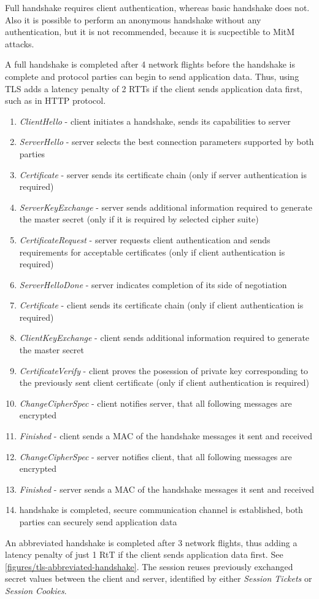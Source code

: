 Full handshake requires client authentication, whereas basic handshake does not. Also it is possible to perform an anonymous handshake without any authentication, but it is not recommended, because it is sucpectible to MitM attacks.

A full handshake is completed after 4 network flights before the handshake is complete and protocol parties can begin to send application data. Thus, using TLS adds a latency penalty of 2 RTTs if the client sends application data first, such as in HTTP protocol.

\begin{enumerate}
  \item \textit{ClientHello} - client initiates a handshake, sends its capabilities to server
  \item \textit{ServerHello} - server selects the best connection parameters supported by both parties
  \item \textit{Certificate} - server sends its certificate chain (only if server authentication is required)
  \item \textit{ServerKeyExchange} - server sends additional information required to generate the master secret (only if it is required by selected cipher suite)
  \item \textit{CertificateRequest} - server requests client authentication and sends requirements for acceptable certificates (only if client authentication is required)
  \item \textit{ServerHelloDone} - server indicates completion of its side of negotiation
  \item \textit{Certificate} - client sends its certificate chain (only if client authentication is required)
  \item \textit{ClientKeyExchange} - client sends additional information required to generate the master secret
  \item \textit{CertificateVerify} - client proves the posession of private key corresponding to the previously sent client certificate (only if client authentication is required)
  \item \textit{ChangeCipherSpec} - client notifies server, that all following messages are encrypted
  \item \textit{Finished} - client sends a MAC of the handshake messages it sent and received
  \item \textit{ChangeCipherSpec} - server notifies client, that all following messages are encrypted
  \item \textit{Finished} - server sends a MAC of the handshake messages it sent and received
  \item handshake is completed, secure communication channel is established, both parties can securely send application data
\end{enumerate}

An abbreviated handshake is completed after 3 network flights, thus adding a latency penalty of just 1 RtT if the client sends application data first. See \autoref{figures/tls-abbreviated-handshake}. The session reuses previously exchanged secret values between the client and server, identified by either \textit{Session Tickets} or \textit{Session Cookies}.
